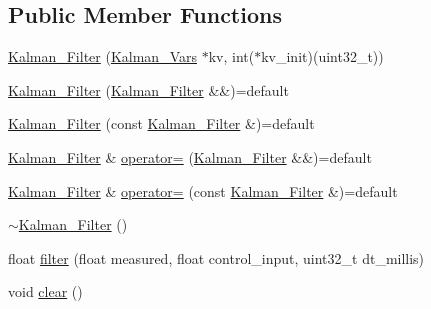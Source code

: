 \subsection*{Public Member Functions}
\begin{DoxyCompactItemize}
\item 
\mbox{\hyperlink{class_kalman___filter_ac917b706405d2056e8edcb12469349d6}{Kalman\+\_\+\+Filter}} (\mbox{\hyperlink{struct_kalman___vars}{Kalman\+\_\+\+Vars}} $\ast$kv, int($\ast$kv\+\_\+init)(uint32\+\_\+t))
\item 
\mbox{\hyperlink{class_kalman___filter_ad7218294c69e625015c505c30072839c}{Kalman\+\_\+\+Filter}} (\mbox{\hyperlink{class_kalman___filter}{Kalman\+\_\+\+Filter}} \&\&)=default
\item 
\mbox{\hyperlink{class_kalman___filter_aaecd5f0a2c95443770f1e96e6d6ae901}{Kalman\+\_\+\+Filter}} (const \mbox{\hyperlink{class_kalman___filter}{Kalman\+\_\+\+Filter}} \&)=default
\item 
\mbox{\hyperlink{class_kalman___filter}{Kalman\+\_\+\+Filter}} \& \mbox{\hyperlink{class_kalman___filter_abdea48a473c55bf2ddf8ded6a8c7ee78}{operator=}} (\mbox{\hyperlink{class_kalman___filter}{Kalman\+\_\+\+Filter}} \&\&)=default
\item 
\mbox{\hyperlink{class_kalman___filter}{Kalman\+\_\+\+Filter}} \& \mbox{\hyperlink{class_kalman___filter_a9873c96adf35331bbf61681895d585fd}{operator=}} (const \mbox{\hyperlink{class_kalman___filter}{Kalman\+\_\+\+Filter}} \&)=default
\item 
\mbox{\hyperlink{class_kalman___filter_ae28ab3bf701a35f7c1be1a8ce9e58ab8}{$\sim$\+Kalman\+\_\+\+Filter}} ()
\item 
float \mbox{\hyperlink{class_kalman___filter_a6ee45f2d0368a57b7ea49185a52d8175}{filter}} (float measured, float control\+\_\+input, uint32\+\_\+t dt\+\_\+millis)
\item 
void \mbox{\hyperlink{class_kalman___filter_a530ce9a34bda5562f01e782d4e4d5ebb}{clear}} ()
\end{DoxyCompactItemize}
